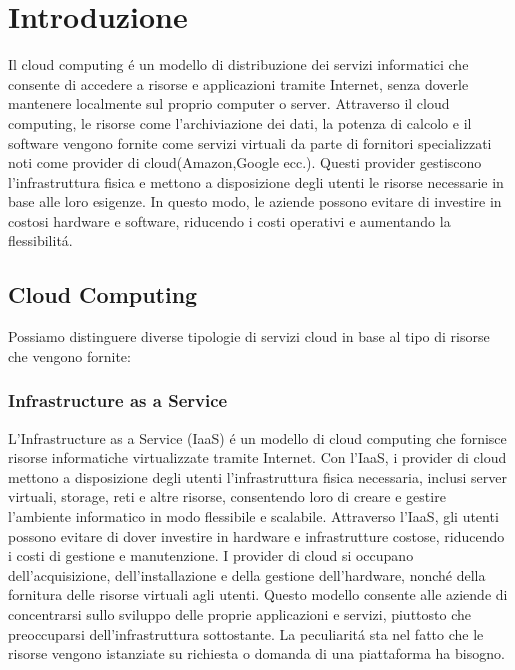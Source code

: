 \documentclass[../../main.tex]{subfiles}
\begin{document}
    
\chapter{Introduzione}

Il cloud computing é un modello di distribuzione dei servizi informatici che consente di accedere a risorse e applicazioni tramite Internet, senza doverle mantenere localmente sul proprio computer o server. 
Attraverso il cloud computing, le risorse come l'archiviazione dei dati, la potenza di calcolo e il software vengono fornite come servizi virtuali da parte di fornitori specializzati noti come provider di cloud(Amazon,Google ecc.).
Questi provider gestiscono l'infrastruttura fisica e mettono a disposizione degli utenti le risorse necessarie in base alle loro esigenze. In questo modo, le aziende possono evitare di investire in costosi hardware e software, riducendo i costi operativi e aumentando la flessibilitá.

\section{Cloud Computing}
Possiamo distinguere diverse tipologie di servizi cloud in base al tipo di risorse che vengono fornite:
\subsection{Infrastructure as a Service}
L'Infrastructure as a Service (IaaS) é un modello di cloud computing che fornisce risorse informatiche virtualizzate tramite Internet. Con l'IaaS, i provider di cloud mettono a disposizione degli utenti l'infrastruttura fisica necessaria, inclusi server virtuali, storage, reti e altre risorse, consentendo loro di creare e gestire l'ambiente informatico in modo flessibile e scalabile.
Attraverso l'IaaS, gli utenti possono evitare di dover investire in hardware e infrastrutture costose, riducendo i costi di gestione e manutenzione. I provider di cloud si occupano dell'acquisizione, dell'installazione e della gestione dell'hardware, nonché della fornitura delle risorse virtuali agli utenti. Questo modello consente alle aziende di concentrarsi sullo sviluppo delle proprie applicazioni e servizi, piuttosto che preoccuparsi dell'infrastruttura sottostante.
La peculiaritá sta nel fatto che le risorse vengono istanziate su richiesta o domanda di una piattaforma ha bisogno.
\end{document}
